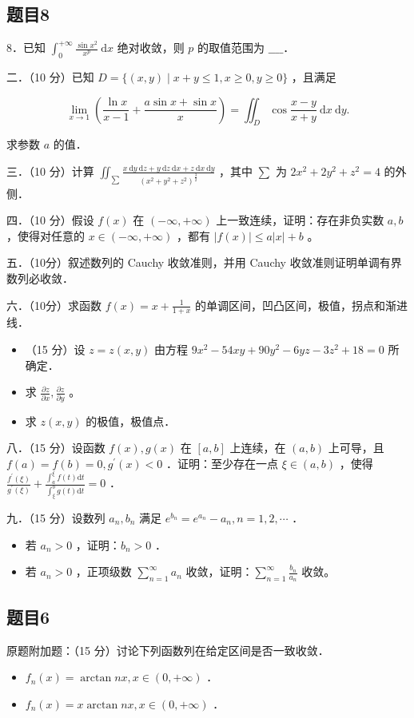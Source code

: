 \documentclass{article}
\begin{document}
\subsection{题目8}
8．已知 \(\int_{0}^{+\infty} \frac{\sin x^{2}}{x^{p}} \mathrm{~d} x\) 绝对收敛，则 \(p\) 的取值范围为 \(\_\_\_\_\)．

二．（10 分）已知 \(D=\{(x, y) \mid x+y \leq 1, x \geq 0, y \geq 0\}\) ，且满足

\[
\lim _{x \rightarrow 1}\left(\frac{\ln x}{x-1}+\frac{a \sin x+\sin x}{x}\right)=\iint_{D} \cos \frac{x-y}{x+y} \mathrm{~d} x \mathrm{~d} y .
\]

求参数 \(a\) 的值．

三．（10 分）计算 \(\iint_{\sum} \frac{x \mathrm{~d} y \mathrm{~d} z+y \mathrm{~d} z \mathrm{~d} x+z \mathrm{~d} x \mathrm{~d} y}{\left(x^{2}+y^{2}+z^{2}\right)^{\frac{3}{2}}}\) ，其中 \(\sum\) 为 \(2 x^{2}+2 y^{2}+z^{2}=4\) 的外侧．

四．（10 分）假设 \(f(x)\) 在 \((-\infty,+\infty)\) 上一致连续，证明：存在非负实数 \(a, b\) ，使得对任意的 \(x \in (-\infty,+\infty)\) ，都有 \(|f(x)| \leq a|x|+b\) 。

五．（10分）叙述数列的 Cauchy 收敛准则，并用 Cauchy 收敛准则证明单调有界数列必收敛．

六．（10分）求函数 \(f(x)=x+\frac{1}{1+x}\) 的单调区间，凹凸区间，极值，拐点和渐进线．

\begin{itemize}
  \item[七．] （15 分）设 \(z=z(x, y)\) 由方程 \(9 x^{2}-54 x y+90 y^{2}-6 y z-3 z^{2}+18=0\) 所确定．
  \item[（1）] 求 \(\frac{\partial z}{\partial x}, \frac{\partial z}{\partial y}\) 。
  \item[（2）] 求 \(z(x, y)\) 的极值，极值点．
\end{itemize}

八．（15 分）设函数 \(f(x), g(x)\) 在 \([a, b]\) 上连续，在 \((a, b)\) 上可导，且 \(f(a)=f(b)=0, g^{\prime}(x)<0\) ．证明：至少存在一点 \(\xi \in(a, b)\) ，使得 \(\frac{f^{\prime}(\xi)}{g^{\prime}(\xi)}+\frac{\int_{a}^{\xi} f(t) \mathrm{d} t}{\int_{\xi}^{b} g(t) \mathrm{d} t}=0\) ．

九．（15 分）设数列 \(a_{n}, b_{n}\) 满足 \(e^{b_{n}}=e^{a_{n}}-a_{n}, n=1,2, \cdots\) ．

\begin{itemize}
  \item[（1）] 若 \(a_{n}>0\) ，证明：\(b_{n}>0\) ．
  \item[（2）] 若 \(a_{n}>0\) ，正项级数 \(\sum_{n=1}^{\infty} a_{n}\) 收敛，证明：\(\sum_{n=1}^{\infty} \frac{b_{n}}{a_{n}}\) 收敛。
\end{itemize}

\subsection{题目6}
原题附加题：（15 分）讨论下列函数列在给定区间是否一致收敛．

\begin{itemize}
  \item[（1）] \(f_{n}(x)=\arctan n x, x \in(0,+\infty)\) ．
  \item[（2）] \(f_{n}(x)=x \arctan n x, x \in(0,+\infty)\) ．
\end{itemize}
\end{document}
